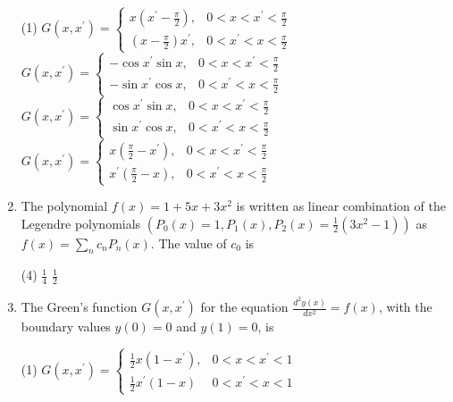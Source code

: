 \begin{enumerate}[label=\color{ocre}\textbf{\arabic*.}]
	{}
	\begin{tasks}(1)
		\task[\textbf{A.}] $G\left(x, x^{\prime}\right)=\left\{\begin{array}{ll}x\left(x^{\prime}-\frac{\pi}{2}\right), & 0<x<x^{\prime}<\frac{\pi}{2} \\ \left(x-\frac{\pi}{2}\right) x^{\prime}, & 0<x^{\prime}<x<\frac{\pi}{2}\end{array}\right.$
		\task[\textbf{B.}] $G\left(x, x^{\prime}\right)=\left\{\begin{array}{ll}-\cos x^{\prime} \sin x, & 0<x<x^{\prime}<\frac{\pi}{2} \\ -\sin x^{\prime} \cos x, & 0<x^{\prime}<x<\frac{\pi}{2}\end{array}\right.$
		\task[\textbf{C.}] $G\left(x, x^{\prime}\right)=\left\{\begin{array}{ll}\cos x^{\prime} \sin x, & 0<x<x^{\prime}<\frac{\pi}{2} \\ \sin x^{\prime} \cos x, & 0<x^{\prime}<x<\frac{\pi}{2}\end{array}\right.$
		\task[\textbf{D.}] $G\left(x, x^{\prime}\right)=\left\{\begin{array}{ll}x\left(\frac{\pi}{2}-x^{\prime}\right), & 0<x<x^{\prime}<\frac{\pi}{2} \\ x^{\prime}\left(\frac{\pi}{2}-x\right), & 0<x^{\prime}<x<\frac{\pi}{2}\end{array}\right.$
	\end{tasks}
	\item The polynomial $f(x)=1+5 x+3 x^{2}$ is written as linear combination of the Legendre polynomials
	$\left(P_{0}(x)=1, P_{1}(x), P_{2}(x)=\frac{1}{2}\left(3 x^{2}-1\right)\right)$ as $f(x)=\sum_{n} c_{n} P_{n}(x)$. The value of $c_{0}$ is
	{}
	\begin{tasks}(4)
		\task[\textbf{A.}] $\frac{1}{4}$
		\task[\textbf{B.}] $\frac{1}{2}$
	\end{tasks}
	\item The Green's function $G\left(x, x^{\prime}\right)$ for the equation $\frac{d^{2} y(x)}{d x^{2}}=f(x)$, with the boundary values $y(0)=0$ and $y(1)=0$, is
	{}
	\begin{tasks}(1)
		\task[\textbf{A.}] $G\left(x, x^{\prime}\right)=\left\{\begin{array}{ll}\frac{1}{2} x\left(1-x^{\prime}\right), & 0<x<x^{\prime}<1 \\ \frac{1}{2} x^{\prime}(1-x) & 0<x^{\prime}<x<1\end{array}\right.$

\end{tasks}
\end{enumerate}
